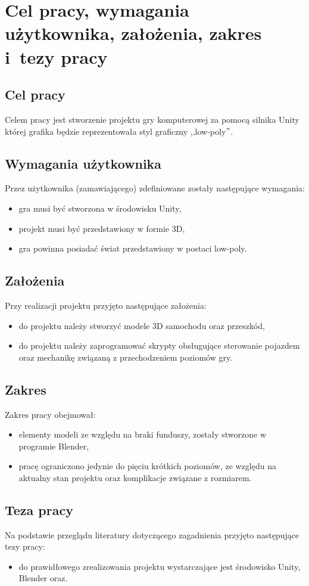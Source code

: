 \chapter{Cel pracy, wymagania użytkownika, założenia, zakres i~tezy pracy}
\section{Cel pracy}\label{cel}
Celem pracy jest stworzenie projektu gry komputerowej za pomocą silnika Unity której grafika będzie reprezentowała styl graficzny ,,low-poly$"$.

\section{Wymagania użytkownika}
Przez użytkownika (zamawiającego) zdefiniowane zostały następujące wymagania:
\begin{itemize}
\item gra musi być stworzona w środowisku Unity,
\item projekt musi być przedstawiony w formie 3D,
\item gra powinna posiadać świat przedstawiony w postaci low-poly.
\end{itemize}
\section{Założenia}
Przy realizacji projektu przyjęto następujące założenia:
\begin{itemize}
\item do projektu należy stworzyć modele 3D samochodu oraz przeszkód,
\item do projektu należy zaprogramować skrypty obsługujące sterowanie pojazdem oraz mechanikę związaną z przechodzeniem poziomów gry.
\end{itemize}
\section{Zakres}
Zakres pracy obejmował:
\begin{itemize}
\item elementy modeli ze względu na braki funduszy, zostały stworzone w programie Blender,
\item pracę ograniczono jedynie do pięciu krótkich poziomów, ze względu na aktualny stan projektu oraz komplikacje związane z rozmiarem.
\end{itemize}
\newpage
\section{Teza pracy}
Na podstawie przeglądu literatury dotyczącego zagadnienia przyjęto następujące tezy pracy:
\begin{itemize}
  \item do prawidłowego zrealizowania projektu wystarczające jest środowisko Unity, Blender oraz.
\end{itemize}
